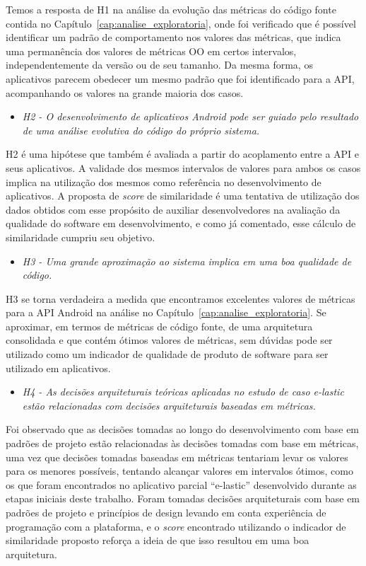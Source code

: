 Temos a resposta de H1 na análise da evolução das métricas do código fonte contida no Capítulo~\ref{cap:analise_exploratoria}, onde foi verificado que é possível identificar um padrão de comportamento nos valores das métricas, que indica uma permanência dos valores de métricas OO em certos intervalos, independentemente da versão ou de seu tamanho. Da mesma forma, os aplicativos parecem obedecer um mesmo padrão que foi identificado para a API, acompanhando os valores na grande maioria dos casos.

\begin{itemize}
\item \textit{H2 - O desenvolvimento de aplicativos Android pode ser guiado pelo resultado de uma análise evolutiva do código do próprio sistema.}
\end{itemize}

H2 é uma hipótese que também é avaliada a partir do acoplamento entre a API e seus aplicativos. A validade dos mesmos intervalos de valores para ambos os casos implica na utilização dos mesmos como referência no desenvolvimento de aplicativos. A proposta de \textit{score} de similaridade é uma tentativa de utilização dos dados obtidos com esse propósito de auxiliar desenvolvedores na avaliação da qualidade do software em desenvolvimento, e como já comentado, esse cálculo de similaridade cumpriu seu objetivo.

\begin{itemize}
\item \textit{H3 - Uma grande aproximação ao sistema implica em uma boa qualidade de código.}
\end{itemize}

H3 se torna verdadeira a medida que encontramos excelentes valores de métricas para a API Android na análise no Capítulo~\ref{cap:analise_exploratoria}. Se aproximar, em termos de métricas de código fonte, de uma arquitetura consolidada e que contém ótimos valores de métricas, sem dúvidas pode ser utilizado como um indicador de qualidade de produto de software para ser utilizado em aplicativos.

\begin{itemize}
\item \textit{H4 - As decisões arquiteturais teóricas aplicadas no estudo de caso e-lastic estão relacionadas com decisões arquiteturais baseadas em métricas.}
\end{itemize}

Foi observado que as decisões tomadas ao longo do desenvolvimento com base em padrões de projeto estão relacionadas às decisões tomadas com base em métricas, uma vez que decisões tomadas baseadas em métricas tentariam levar os valores para os menores possíveis, tentando alcançar valores em intervalos ótimos, como os que foram encontrados no aplicativo parcial ``e-lastic'' desenvolvido durante as etapas iniciais deste trabalho. Foram tomadas decisões arquiteturais com base em padrões de projeto e princípios de design levando em conta experiência de programação com a plataforma, e o \textit{score} encontrado utilizando o indicador de similaridade proposto reforça a ideia de que isso resultou em uma boa arquitetura.

